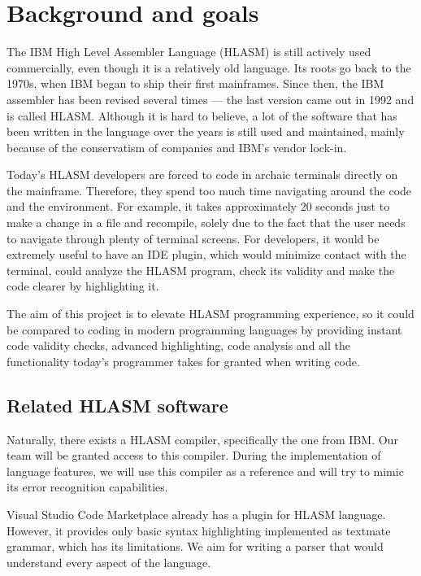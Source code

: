 \chapter{Background and goals}


The IBM High Level Assembler Language (HLASM) is still actively used commercially, even though it is a relatively old language. Its roots go back to the 1970s, when IBM began to ship their first mainframes. Since then, the IBM assembler has been revised several times --- the last version came out in 1992 and is called HLASM. Although it is hard to believe, a lot of the software that has been written in the language over the years is still used and maintained, mainly because of the conservatism of companies and IBM's vendor lock-in.

Today's HLASM developers are forced to code in archaic terminals directly on the mainframe. Therefore, they spend too much time navigating around the code and the environment. For example, it takes approximately 20 seconds just to make a change in a file and recompile, solely due to the fact that the user needs to navigate through plenty of terminal screens. For developers, it would be extremely useful to have an IDE plugin, which would minimize contact with the terminal, could analyze the HLASM program, check its validity and make the code clearer by highlighting it. 

The aim of this project is to elevate HLASM programming experience, so it could be compared to coding in modern programming languages by providing instant code validity checks, advanced highlighting, code analysis and all the functionality today's programmer takes for granted when writing code.

\section{Related HLASM software}
Naturally, there exists a HLASM compiler, specifically the one from IBM. Our team will be granted access to this compiler. During the implementation of language features, we will use this compiler as a reference and will try to mimic its error recognition capabilities.

Visual Studio Code Marketplace already has a plugin for HLASM language. However, it provides only basic syntax highlighting implemented as textmate grammar, which has its limitations. We aim for writing a parser that would understand every aspect of the language.